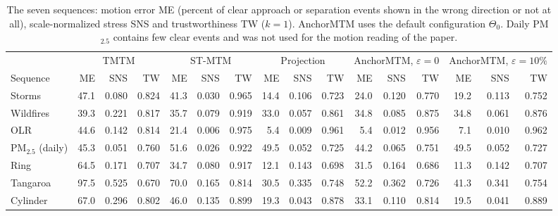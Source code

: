 \documentclass[preprint]{vgtc}   %
\begin{document}
\begin{table}[t]
\centering\small
\caption{The seven sequences: motion error ME (percent of clear approach or separation events shown in the wrong direction or not at all), scale-normalized stress SNS and trustworthiness TW ($k=1$). AnchorMTM uses the default configuration $\Theta_0$. Daily PM$_{2.5}$ contains few clear events and was not used for the motion reading of the paper.}\label{tab:full-bound-other}
\setlength{\tabcolsep}{3.2pt}
\begin{tabular}{l|rrr|rrr|rrr|rrr|rrr}\toprule
 & \multicolumn{3}{c|}{TMTM} & \multicolumn{3}{c|}{ST-MTM} & \multicolumn{3}{c|}{Projection} & \multicolumn{3}{c|}{AnchorMTM, $\varepsilon=0$} & \multicolumn{3}{c}{AnchorMTM, $\varepsilon=10\%$}\\
Sequence & ME & SNS & TW & ME & SNS & TW & ME & SNS & TW & ME & SNS & TW & ME & SNS & TW\\\midrule
Storms & 47.1 & 0.080 & 0.824 & 41.3 & 0.030 & 0.965 & 14.4 & 0.106 & 0.723 & 24.0 & 0.120 & 0.770 & 19.2 & 0.113 & 0.752\\
Wildfires & 39.3 & 0.221 & 0.817 & 35.7 & 0.079 & 0.919 & 33.0 & 0.057 & 0.861 & 34.8 & 0.085 & 0.875 & 34.8 & 0.061 & 0.876\\
OLR & 44.6 & 0.142 & 0.814 & 21.4 & 0.006 & 0.975 & 5.4 & 0.009 & 0.961 & 5.4 & 0.012 & 0.956 & 7.1 & 0.010 & 0.962\\
PM$_{2.5}$ (daily) & 45.3 & 0.051 & 0.760 & 51.6 & 0.026 & 0.922 & 49.5 & 0.052 & 0.725 & 44.2 & 0.065 & 0.751 & 49.5 & 0.052 & 0.727\\
Ring & 64.5 & 0.171 & 0.707 & 34.7 & 0.080 & 0.917 & 12.1 & 0.143 & 0.698 & 31.5 & 0.164 & 0.686 & 11.3 & 0.142 & 0.707\\
Tangaroa & 97.5 & 0.525 & 0.670 & 70.0 & 0.165 & 0.814 & 30.5 & 0.335 & 0.748 & 52.2 & 0.362 & 0.726 & 41.3 & 0.341 & 0.754\\
Cylinder & 67.0 & 0.296 & 0.802 & 46.0 & 0.135 & 0.899 & 19.3 & 0.043 & 0.878 & 33.1 & 0.110 & 0.814 & 19.5 & 0.041 & 0.889\\\bottomrule
\end{tabular}
\end{table}
\end{document}
